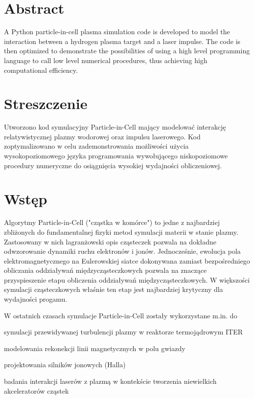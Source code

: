 \section{Abstract} %
A Python particle-in-cell plasma simulation code is developed to model the interaction between a hydrogen plasma target
and a laser impulse. The code is then optimized to demonstrate the possibilities of using a high level programming
language to call low level numerical procedures, thus achieving high computational efficiency.

\section{Streszczenie}
Utworzono kod symulacyjny Particle-in-Cell mający modelować interakcję relatywistycznej plazmy wodorowej oraz
impulsu laserowego. Kod zoptymalizowano w celu zademonstrowania możliwości użycia wysokopoziomowego języka programowania
wywołującego niskopoziomowe procedury numeryczne do osiągnięcia wysokiej wydajności obliczeniowej.

\section{Wstęp} %
Algorytmy Particle-in-Cell ("cząstka w komórce") to jedne z najbardziej zbliżonych do fundamentalnej fizyki
metod symulacji materii w stanie plazmy. Zastosowany w nich lagranżowski opis cząsteczek pozwala na dokładne
odwzorowanie dynamiki ruchu elektronów i jonów. Jednocześnie, ewolucja pola elektromagnetycznego na Eulerowskiej
siatce dokonywana zamiast bezpośredniego obliczania oddziaływań międzycząsteczkowych pozwala na znaczące
przyspieszenie etapu obliczenia oddziaływań międzycząsteczkowych. W większości symulacji cząsteczkowych właśnie
ten etap jest najbardziej krytyczny dla wydajności progamu.

W ostatnich czasach symulacje Particle-in-Cell zostały wykorzystane m.in. do
\item symulacji przewidywanej turbulencji plazmy w reaktorze termojądrowym ITER %
\item modelowania rekonekcji linii magnetycznych w polu gwiazdy %
\item projektowania silników jonowych (Halla) %
\item badania interakcji laserów z plazmą w kontekście tworzenia niewielkich akceleratorów cząstek %

